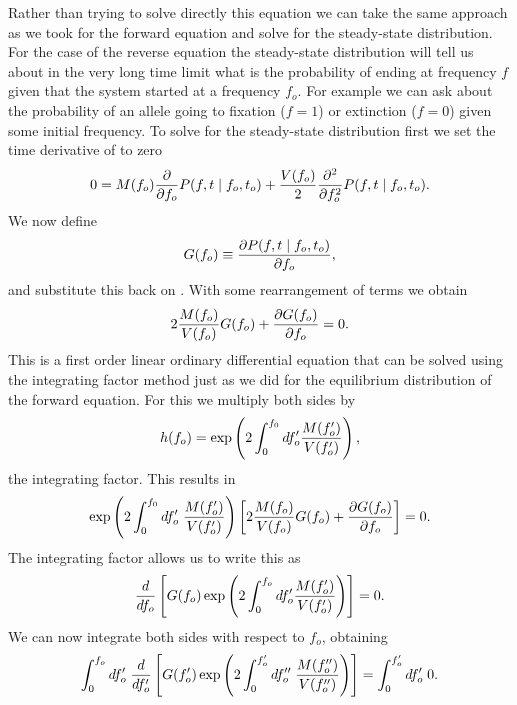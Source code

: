 Rather than trying to solve directly this equation we can take the same approach
as we took for the forward equation and solve for the steady-state distribution.
For the case of the reverse equation the steady-state distribution will tell us
about in the very long time limit what is the probability of ending at frequency
$f$ given that the system started at a frequency $f_o$. For example we can ask
about the probability of an allele going to fixation ($f = 1$) or extinction
($f = 0$) given some initial frequency. To solve for the steady-state
distribution first we set the time derivative of 
to zero
\begin{equation}
	0 = M(f_o) {\partial \over \partial f_o}P(f, t \mid f_o, t_o) +
	{V(f_o) \over 2} {\partial^2 \over \partial f_o^2} P(f, t \mid f_o, t_o).
	\label{eq_kolmogorov_backward_rev}
\end{equation}
We now define
\begin{equation}
	G(f_o) \equiv {\partial P(f, t \mid f_o, t_o) \over \partial f_o},
\end{equation}
and substitute this back on . With some
rearrangement of terms we obtain
\begin{equation}
	2 {M(f_o) \over V(f_o)} G(f_o) + {\partial G(f_o) \over \partial f_o} = 0.
\end{equation}
This is a first order linear ordinary differential equation that can be solved
using the integrating factor method just as we did for the equilibrium
distribution of the forward equation. For this we multiply both sides by
\begin{equation}
	h(f_o) = \exp \left( 2 \int_0^{f_0} df_o' {M(f_o') \over V(f_o')} \right),
\end{equation}
the integrating factor. This results in
\begin{equation}
	\exp \left( 2 \int_0^{f_0} df_o'\; {M(f_o') \over V(f_o')} \right)
	\left[
	2 {M(f_o) \over V(f_o)} G(f_o) + {\partial G(f_o) \over \partial f_o}
	\right] = 0.
\end{equation}
The integrating factor allows us to write this as
\begin{equation}
	{d \over df_o} \left[
	G(f_o) \exp \left(
	2 \int_0^{f_o} df_o' {M(f_o') \over V(f_o')}
	\right)
	\right] = 0.
\end{equation}
We can now integrate both sides with respect to $f_o$, obtaining
\begin{equation}
	\int_0^{f_o} df_o' \; {d \over df_o'} \left[
	G(f_o') \exp \left(
	2 \int_0^{f_o'} df_o'' \; {M(f_o'') \over V(f_o'')}
	\right)	\right] = \int_0^{f_o'} df_o' \; 0.
\end{equation}
